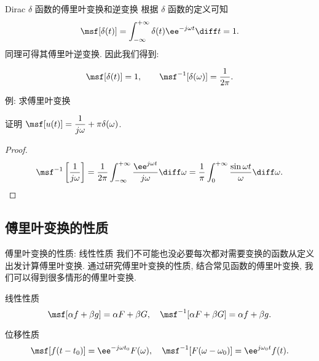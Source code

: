 \begin{frame}{Dirac $\delta$ 函数的傅里叶变换和逆变换}
	\onslide<+->
	根据 $\delta$ 函数的定义可知
	\[\msf[\delta(t)]=\int_{-\infty}^{+\infty}\delta(t)\ee^{-j\omega t}\diff t=1.
	\]
	\onslide<+->
	同理可得其傅里叶逆变换.
	\onslide<+->
	因此我们得到:
	\begin{theorem@}
	\[
		\msf[\delta(t)]=1,\qquad
		\msf^{-1}[\delta(\omega)]=\dfrac1{2\pi}.
	\]
	\end{theorem@}
\end{frame}


\begin{frame}{例: 求傅里叶变换}
	\onslide<+->
	\begin{example}
		证明 \alert{$\msf[u(t)]=\dfrac1{j\omega}+\pi\delta(\omega)$}.
	\end{example}

	\onslide<+->
	\begin{proof}
			\[\msf^{-1}\left[\frac1{j\omega}\right]
			=\frac1{2\pi}\int_{-\infty}^{+\infty}\frac{\ee^{j\omega t}}{j\omega} \diff\omega
			=\frac1\pi\int_0^{+\infty}\frac{\sin\omega t}{\omega} \diff\omega.
	\]
		\onslide<+->{故
			\[\msf^{-1} \left[\frac1{j\omega}+\pi\delta(\omega)\right]
			=\half\sgn(t)+\half =u(t)\quad (t\neq 0).\qedhere
	\]
		}
	\end{proof}
\end{frame}


\subsection{傅里叶变换的性质}


\begin{frame}{傅里叶变换的性质: 线性性质}
	\onslide<+->
	我们不可能也没必要每次都对需要变换的函数从定义出发计算傅里叶变换.
	\onslide<+->
	通过研究傅里叶变换的性质, 结合常见函数的傅里叶变换, 我们可以得到很多情形的傅里叶变换.

	\onslide<+->
	\begin{main}{线性性质}
	\[
		\msf[\alpha f+\beta g]=\alpha F+\beta G,\quad
		\msf^{-1}[\alpha F+\beta G]=\alpha f+\beta g.
	\]
	\end{main}

	\onslide<+->
	\begin{main}{位移性质}
	\[
		\msf[f(t-t_0)]=\ee^{-j\omega t_0}F(\omega),\quad
		\msf^{-1}[F(\omega-\omega_0)]=\ee^{j\omega_0 t}f(t).
	\]
		\vspace{-\baselineskip}
	\end{main}
\end{frame}


